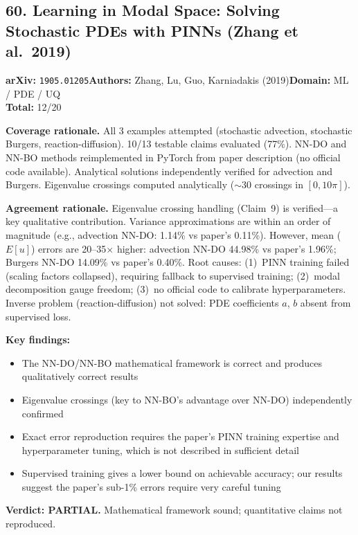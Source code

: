 \subsection{60. Learning in Modal Space: Solving Stochastic PDEs with PINNs (Zhang et al.\ 2019)}
\textbf{arXiv:} \texttt{1905.01205}\quad\textbf{Authors:} Zhang, Lu, Guo, Karniadakis (2019)\quad\textbf{Domain:} ML / PDE / UQ\\
\quad{}\quad\textbf{Total:} 12/20\par\smallskip
\noindent\textbf{Coverage rationale.} All 3 examples attempted (stochastic advection, stochastic Burgers, reaction-diffusion). 10/13 testable claims evaluated (77\%). NN-DO and NN-BO methods reimplemented in PyTorch from paper description (no official code available). Analytical solutions independently verified for advection and Burgers. Eigenvalue crossings computed analytically ($\sim$30 crossings in $[0,10\pi]$).\par
\noindent\textbf{Agreement rationale.} Eigenvalue crossing handling (Claim~9) is verified---a key qualitative contribution. Variance approximations are within an order of magnitude (e.g., advection NN-DO: 1.14\% vs paper's 0.11\%). However, mean ($E[u]$) errors are 20--35$\times$ higher: advection NN-DO 44.98\% vs paper's 1.96\%; Burgers NN-DO 14.09\% vs paper's 0.40\%. Root causes: (1)~PINN training failed (scaling factors collapsed), requiring fallback to supervised training; (2)~modal decomposition gauge freedom; (3)~no official code to calibrate hyperparameters. Inverse problem (reaction-diffusion) not solved: PDE coefficients $a$, $b$ absent from supervised loss.\par\smallskip
\noindent\textbf{Key findings:}
\begin{itemize}[leftmargin=1.4em,itemsep=0.2em,topsep=0.2em]
\item The NN-DO/NN-BO mathematical framework is correct and produces qualitatively correct results
\item Eigenvalue crossings (key to NN-BO's advantage over NN-DO) independently confirmed
\item Exact error reproduction requires the paper's PINN training expertise and hyperparameter tuning, which is not described in sufficient detail
\item Supervised training gives a lower bound on achievable accuracy; our results suggest the paper's sub-1\% errors require very careful tuning
\end{itemize}
\noindent\textbf{Verdict: PARTIAL.} Mathematical framework sound; quantitative claims not reproduced.
